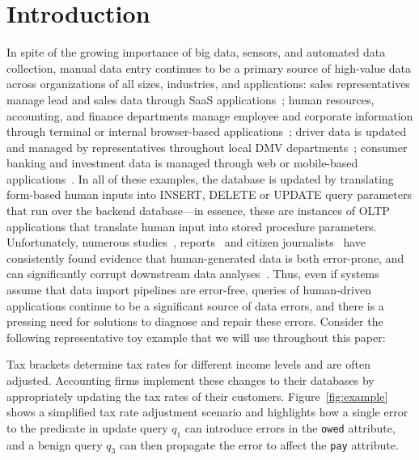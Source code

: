 
\section{Introduction}

\label{s:intro}


In spite of the growing importance of big data, sensors, and automated
data collection, manual data entry continues to be a primary source of
high-value data across organizations of all sizes, industries, and
applications: sales representatives manage lead and sales data through
SaaS applications~\cite{salesforce}; human resources, accounting, and
finance departments manage employee and corporate information through
terminal or internal browser-based applications~\cite{sap}; driver
data is updated and managed by representatives throughout local DMV
departments~\cite{dmv,dmvsystem}; consumer banking and investment data
is managed through web or mobile-based
applications~\cite{betterment,chase}. In all of these examples, the
database is updated by translating form-based human inputs into
INSERT, DELETE or UPDATE query parameters that run over the backend
database---in essence, these are instances of OLTP applications that
translate human input into stored procedure parameters. Unfortunately,
numerous studies~\cite{kandel2012,krishnan2016hilda,Barchard20111834},
reports~\cite{citibank,Yates10,Grady13,Robeznieks05} and citizen
journalists~\cite{iquantnyc} have consistently found evidence that
human-generated data is both error-prone, and can significantly
corrupt downstream data analyses~\cite{iquantnycnypd}. Thus, even if
systems assume that data import pipelines are error-free, queries of
human-driven applications continue to be a significant source of data
errors, and there is a pressing need for solutions to diagnose and
repair these errors. Consider the following representative toy example
that we will use throughout this paper:

\begin{example}\label{ex:taxes}
Tax brackets determine tax rates for different income levels and are
often adjusted. Accounting firms implement these changes to their
databases by appropriately updating the tax rates of their customers.
Figure~\ref{fig:example} shows a simplified tax rate adjustment
scenario and highlights how a single error to the predicate in update
query $q_1$ can introduce errors in the \texttt{owed} attribute, and a
benign query $q_3$ can then propagate the error to affect the
\texttt{pay} attribute.
\end{example}

